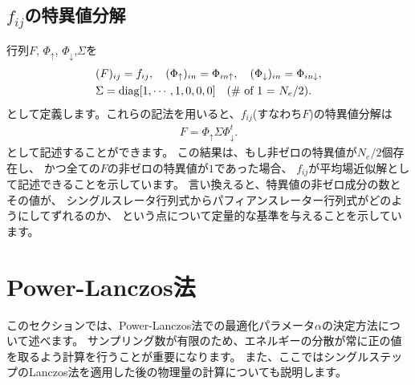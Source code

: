 \subsection{$f_{ij}$の特異値分解}
行列$F$, $\Phi_{\uparrow}$, $\Phi_{\downarrow}$,$\Sigma$を
\begin{align}
&(F)_{ij}=f_{ij},~~~ 
(\Phi_{\uparrow})_{in}=\Phi_{in\uparrow},~~~ 
(\Phi_{\downarrow})_{in}=\Phi_{in\downarrow}, \\
&\Sigma={\rm diag}[1,\cdots,1,0,0,0]~~~\text{({\rm \# of 1} = $N_{e}/2$)}.
\end{align}
として定義します。これらの記法を用いると、$f_{ij}$(すなわち$F$)の特異値分解は
\begin{align}
F=\Phi_{\uparrow}\Sigma\Phi_{\downarrow}^{t}.
\end{align}
として記述することができます。
この結果は、もし非ゼロの特異値が$N_{e}/2$個存在し、
かつ全ての$F$の非ゼロの特異値が$1$であった場合、
$f_{ij}$が平均場近似解として記述できることを示しています。
言い換えると、特異値の非ゼロ成分の数とその値が、
シングルスレータ行列式からパフィアンスレーター行列式がどのようにしてずれるのか、
という点について定量的な基準を与えることを示しています。

\section{Power-Lanczos法}
このセクションでは、Power-Lanczos法での最適化パラメータ$\alpha$の決定方法について述べます。
サンプリング数が有限のため、エネルギーの分散が常に正の値を取るよう計算を行うことが重要になります。
また、ここではシングルステップのLanczos法を適用した後の物理量の計算についても説明します。
